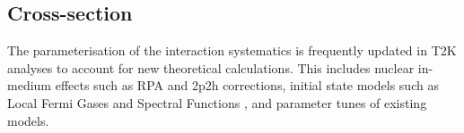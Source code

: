 
\subsection{Cross-section}
\label{subsec:syst_xsec}
The parameterisation of the interaction systematics is frequently updated in T2K analyses to account for new theoretical calculations. This includes nuclear in-medium effects such as RPA and 2p2h corrections\cite{nieves1,nieves2}, initial state models such as Local Fermi Gases \cite{lfg} and Spectral Functions \cite{benhar}, and parameter tunes of existing models\cite{ccqe_tuning}.

